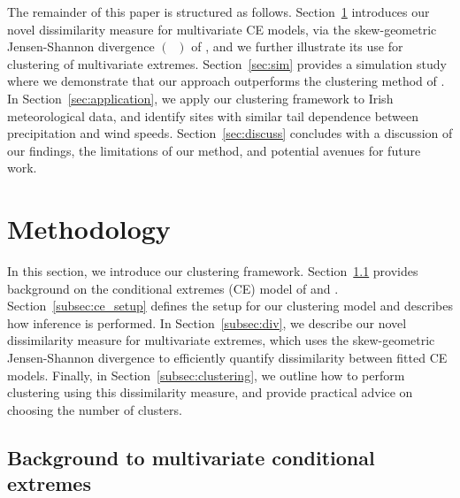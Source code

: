 \documentclass[preprint,12pt,authoryear]{elsarticle}
\newcommand{\JSGa}{\mathop{\mathrm{JS}^{\mathrm{G}_{\lambda}}}\nolimits}
\begin{document}
The remainder of this paper is structured as follows.
Section~\ref{sec:method} introduces our novel dissimilarity measure for multivariate CE models, via the
skew-geometric Jensen-Shannon divergence $\left(\JSGa{}\right)$ of \citet{Nielsen2019}, and we further illustrate its use for clustering of multivariate extremes. 
Section~\ref{sec:sim} provides a simulation study where we demonstrate that our approach outperforms the clustering method of \citet{Vignotto2021}.
In Section~\ref{sec:application}, we apply our clustering framework to Irish meteorological data, and identify sites with similar tail dependence between precipitation and wind speeds.
Section~\ref{sec:discuss} concludes with a discussion of our findings, the limitations of our method, and potential avenues for future work. %

\section{Methodology}
\label{sec:method}

In this section, we introduce our clustering framework. 
Section~\ref{subsec:ce_model} provides background on the conditional extremes (CE) model of \citet{Heffernan2004} and \citet{Keef2013}.
Section~\ref{subsec:ce_setup} defines the setup for our clustering model and describes how inference is performed.
In Section~\ref{subsec:div}, we describe our novel dissimilarity measure for multivariate extremes, which uses the skew-geometric Jensen-Shannon divergence to efficiently quantify dissimilarity between fitted CE models.
Finally, in Section~\ref{subsec:clustering}, we outline how to perform clustering using this dissimilarity measure, and provide practical advice on choosing the number of clusters.

\subsection{Background to multivariate conditional extremes}
\label{subsec:ce_model}
\end{document}
